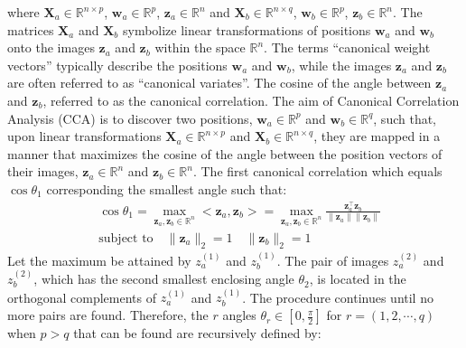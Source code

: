 where $\mathbf{X}_a\in \mathbb{R}^{n\times p}$, ${\mathbf w}_a\in\mathbb{R}^p$, ${\mathbf z}_a\in\mathbb{R}^n$  and $\mathbf{X}_b\in \mathbb{R}^{n\times q}$, $\mathbf{w}_b\in\mathbb{R}^p$, ${\mathbf z}_b\in\mathbb{R}^n$. The matrices $\mathbf{X}_a$ and $\mathbf{X}_b$ symbolize linear transformations of positions ${\mathbf w}_a$ and ${\mathbf w}_b$ onto the images ${\mathbf z}_a$ and ${\mathbf z}_b$ within the space $\mathbb{R}^n$. The terms ``canonical weight vectors'' typically describe the positions ${\mathbf w}_a$ and ${\mathbf w}_b$, while the images ${\mathbf z}_a$ and ${\mathbf z}_b$ are often referred to as ``canonical variates''. The cosine of the angle between ${\mathbf z}_a$ and ${\mathbf z}_b$, referred to as the canonical correlation. The aim of Canonical Correlation Analysis (CCA) is to discover two positions, $\mathbf{w}_a \in \mathbb{R}^p$ and $\mathbf{w}_b \in \mathbb{R}^q$, such that, upon linear transformations $\mathbf{X}_a \in \mathbb{R}^{n\times p}$ and $\mathbf{X}_b \in \mathbb{R}^{n\times q}$, they are mapped in a manner that maximizes the cosine of the angle between the position vectors of their images, $\mathbf{z}_a \in \mathbb{R}^n$ and $\mathbf{z}_b \in \mathbb{R}^n$. The first canonical correlation which equals $\cos\theta_1$ corresponding the smallest angle such that:
\begin{equation}
\begin{aligned}
&\cos \theta_1 = \underset{{\mathbf z}_a, {\mathbf z}_b \in\mathbb{R}^n}{\max}<{\mathbf z}_a, {\mathbf z}_b> 
			   = \underset{{\mathbf z}_a, {\mathbf z}_b \in\mathbb{R}^n}{\max}
			   		 \frac{\mathbf{z}_a^\top \mathbf{z}_b}{\|\mathbf{z}_a\| \|\mathbf{z}_b\|} \\
&\text{subject to}\quad \|{\mathbf z}_a\|_2=1\quad \|{\mathbf z}_b\|_2=1
\end{aligned}
\end{equation}
Let the maximum be attained by $z_{a}^{(1)}$ and $z_{b}^{(1)}$. The pair of images $z_{a}^{(2)}$ and $z_{b}^{(2)}$, which has the second smallest enclosing angle $\theta_2$, is located in the orthogonal complements of $z_{a}^{(1)}$ and $z_{b}^{(1)}$. The procedure continues until no more pairs are found. Therefore, the $r$ angles $\theta_r \in [0, \frac{\pi}{2}]$ for $r = (1,2,\cdots,q)$ when $p > q$ that can be found are recursively defined by:

